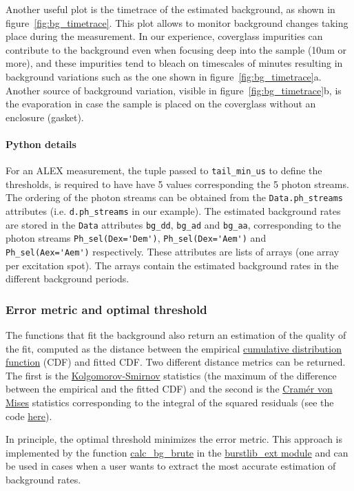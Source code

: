 Another useful plot is the timetrace of the estimated background, as shown in 
figure~\ref{fig:bg_timetrace}. This plot allows to monitor background changes
taking place during the measurement. In our experience, coverglass impurities
can contribute to the background even when focusing deep into the sample (10um or more),
and these impurities tend to bleach on timescales of minutes resulting in
background variations such as the one shown in figure~\ref{fig:bg_timetrace}a.
Another source of background variation, visible in figure~\ref{fig:bg_timetrace}b, is 
the evaporation in case the sample is placed on the coverglass without an enclosure (gasket).

\paragraph{Python details} For an ALEX measurement, the tuple passed to
\verb|tail_min_us| to define the thresholds, is required to have have 
5 values corresponding the 5 photon streams. 
The ordering of the photon streams can be obtained from
the \verb|Data.ph_streams| attributes (i.e. \verb|d.ph_streams| in our example).
The estimated background rates are stored in the \verb|Data| attributes
\verb|bg_dd|, \verb|bg_ad| and \verb|bg_aa|, corresponding to the photon
streams \verb|Ph_sel(Dex='Dem')|, \verb|Ph_sel(Dex='Aem')| and \verb|Ph_sel(Aex='Aem')|
respectively. These attributes are lists of arrays (one array per excitation spot).
The arrays contain the estimated background rates in the different background periods.


\subsubsection{Error metric and optimal threshold}

The functions that fit the background also return an estimation of the
quality of the fit, computed as the distance between the empirical
\href{http://en.wikipedia.org/wiki/Cumulative\_distribution\_function}{cumulative distribution function}
(CDF) and fitted CDF. Two different distance metrics can be returned.
The first is the
\href{http://en.wikipedia.org/wiki/Kolmogorov\%E2\%80\%93Smirnov\_test}{Kolgomorov-Smirnov}
statistics (the maximum of the difference between the empirical and the
fitted CDF) and the second is the
\href{http://en.wikipedia.org/wiki/Cram\%C3\%A9r\%E2\%80\%93von\_Mises\_criterion}{Cramér von Mises}
statistics corresponding to the integral of the squared residuals
(see the code
\href{https://github.com/tritemio/FRETBursts/blob/master/fretbursts/background.py#L41}{here}).

In principle, the optimal threshold minimizes
the error metric. This approach is implemented by the function
\href{http://fretbursts.readthedocs.org/en/latest/plugins.html#fretbursts.burstlib\_ext.calc\_bg\_brute}{calc\_bg\_brute}
in the
\href{http://fretbursts.readthedocs.org/en/latest/plugins.html}{burstlib\_ext module} and can be used
in cases when a user wants to extract the most accurate estimation of background rates.
